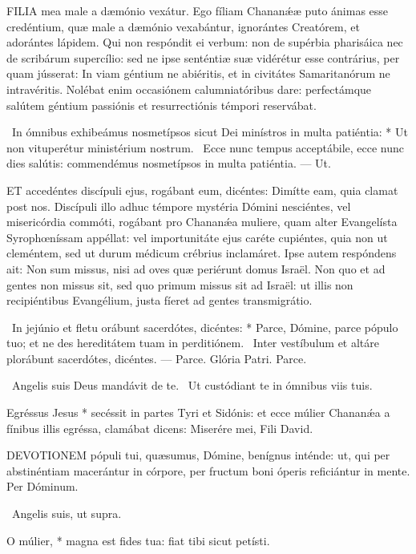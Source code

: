 \lettrine[lines=2]{F}{ILIA} mea male a dæmónio vexátur. Ego fíliam Chananǽæ puto ánimas esse credéntium, quæ male a dæmónio vexabántur, ignorántes Creatórem, et adorántes lápidem. Qui non respóndit ei verbum: non de supérbia pharisáica nec de scribárum supercílio: sed ne ipse senténtiæ suæ vidérétur esse contrárius, per quam jússerat: In viam géntium ne abiéritis, et in civitátes Samaritanórum ne intravéritis. Nolébat enim occasiónem calumniatóribus dare: perfectámque salútem géntium passiónis et resurrectiónis témpori reservábat.

\R\ In ómnibus exhibeámus nosmetípsos sicut Dei minístros in multa patiéntia: * Ut non vituperétur ministérium nostrum. \V\ Ecce nunc tempus acceptábile, ecce nunc dies salútis: commendémus nosmetípsos in multa patiéntia. --- Ut.


\lettrine[lines=2]{E}{T} accedéntes discípuli ejus, rogábant eum, dicéntes: Dimítte eam, quia clamat post nos. Discípuli illo adhuc témpore mystéria Dómini nesciéntes, vel misericórdia commóti, rogábant pro Chananǽa muliere, quam alter Evangelísta Syrophœníssam appéllat: vel importunitáte ejus caréte cupiéntes, quia non ut cleméntem, sed ut durum médicum crébrius inclamáret. Ipse autem respóndens ait: Non sum missus, nisi ad oves quæ periérunt domus Israël. Non quo et ad gentes non missus sit, sed quo primum missus sit ad Israël: ut illis non recipiéntibus Evangélium, justa fíeret ad gentes transmigrátio.

\R\ In jejúnio et fletu orábunt sacerdótes, dicéntes: * Parce, Dómine, parce pópulo tuo; et ne des hereditátem tuam in perditiónem. \V\ Inter vestíbulum et altáre plorábunt sacerdótes, dicéntes. --- Parce. Glória Patri. Parce.

\V\ Angelis suis Deus mandávit de te. \R\ Ut custódiant te in ómnibus viis tuis.

 Egréssus Jesus * secéssit in partes Tyri et Sidónis: et ecce múlier Chananǽa a fínibus illis egréssa, clamábat dicens: Miserére mei, Fili David.


\lettrine[lines=2]{D}{EVOTIONEM} pópuli tui, quæsumus, Dómine, benígnus inténde: ut, qui per abstinéntiam macerántur in córpore, per fructum boni óperis reficiántur in mente. Per Dóminum.

\V\ Angelis suis, ut supra.

 O múlier, * magna est fides tua: fiat tibi sicut petísti.

